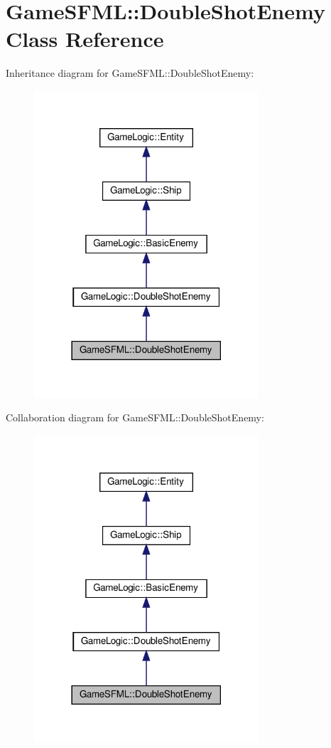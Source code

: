 \hypertarget{classGameSFML_1_1DoubleShotEnemy}{}\section{Game\+S\+F\+ML\+:\+:Double\+Shot\+Enemy Class Reference}
\label{classGameSFML_1_1DoubleShotEnemy}


Inheritance diagram for Game\+S\+F\+ML\+:\+:Double\+Shot\+Enemy\+:
\nopagebreak
\begin{figure}[H]
\begin{center}
\leavevmode
\includegraphics[width=237pt]{classGameSFML_1_1DoubleShotEnemy__inherit__graph}
\end{center}
\end{figure}


Collaboration diagram for Game\+S\+F\+ML\+:\+:Double\+Shot\+Enemy\+:
\nopagebreak
\begin{figure}[H]
\begin{center}
\leavevmode
\includegraphics[width=237pt]{classGameSFML_1_1DoubleShotEnemy__coll__graph}
\end{center}
\end{figure}
